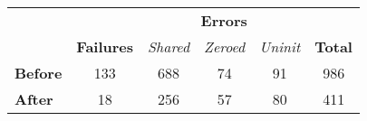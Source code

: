 \small
\begin{tabular}{lc|ccc|c}
\cline{3-5}
                                      & \multicolumn{1}{l|}{} & \multicolumn{3}{c|}{\textbf{Errors}}                                                          & \multicolumn{1}{l}{}                \\ \cline{2-6} 
\multicolumn{1}{l|}{}                 & \textbf{Failures}     & \multicolumn{1}{c|}{\textit{Shared}} & \multicolumn{1}{c|}{\textit{Zeroed}} & \textit{Uninit} & \multicolumn{1}{c|}{\textbf{Total}} \\ \hline\hline
\multicolumn{1}{|l|}{\textbf{Before}} & 133                   & \multicolumn{1}{c|}{688}             & \multicolumn{1}{c|}{74}              & 91              & \multicolumn{1}{c|}{986}            \\ \hline
\multicolumn{1}{|l|}{\textbf{After}}  & 18                    & \multicolumn{1}{c|}{256}             & \multicolumn{1}{c|}{57}              & 80              & \multicolumn{1}{c|}{411}            \\ \hline
\end{tabular}
